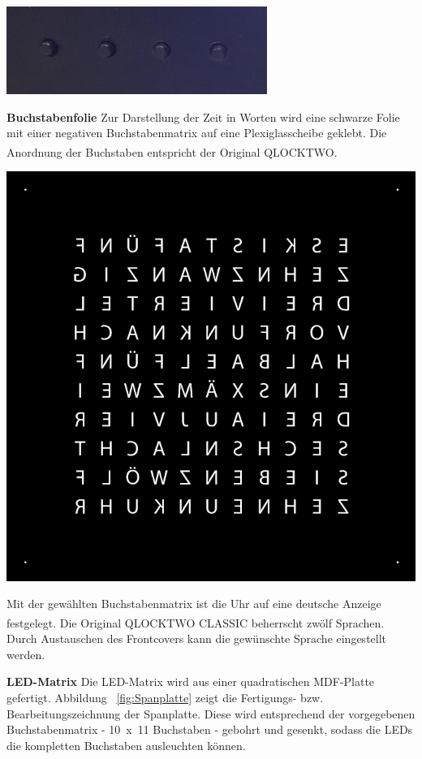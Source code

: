 \begin{multicols}{2}
{}

{
\centering
\includegraphics[width=0.6\columnwidth]{Abbildungen/Konstruktion/Taster03}

}



\textbf{Buchstabenfolie} Zur Darstellung der Zeit in Worten wird eine schwarze Folie mit einer negativen Buchstabenmatrix auf eine Plexiglasscheibe geklebt. Die Anordnung der Buchstaben entspricht der Original QLOCKTWO\textsuperscript{\textregistered}.

{
\centering
\includegraphics[width=0.75\columnwidth]{Abbildungen/Konstruktion/Buchstaben}

}
Mit der gewählten Buchstabenmatrix ist die Uhr auf eine deutsche Anzeige festgelegt. Die Original QLOCKTWO\textsuperscript{\textregistered} CLASSIC beherrscht zwölf Sprachen. Durch Austauschen des Frontcovers kann die gewünschte Sprache eingestellt werden.

\textbf{LED-Matrix} Die LED-Matrix wird aus einer quadratischen MDF-Platte gefertigt. Abbildung ~\ref{fig:Spanplatte} zeigt die Fertigungs- bzw. Bearbeitungszeichnung der Spanplatte. Diese wird entsprechend der vorgegebenen Buchstabenmatrix -  10~x~11 Buchstaben - gebohrt und gesenkt, sodass die LEDs die kompletten Buchstaben ausleuchten können.


\end{multicols}
